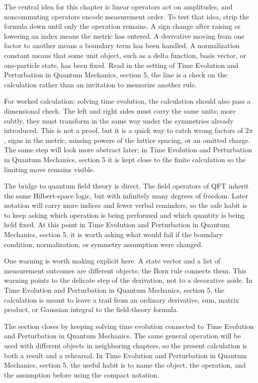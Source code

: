 The central idea for this chapter is linear operators act on amplitudes, and noncommuting operators encode measurement order.  To test that idea, strip the formula down until only the operation remains.  A sign change after raising or lowering an index means the metric has entered.  A derivative moving from one factor to another means a boundary term has been handled.  A normalization constant means that some unit object, such as a delta function, basis vector, or one-particle state, has been fixed.  Read in the setting of Time Evolution and Perturbation in Quantum Mechanics, section 5, the line is a check on the calculation rather than an invitation to memorize another rule.

For worked calculation: solving time evolution, the calculation should also pass a dimensional check.  The left and right sides must carry the same units; more subtly, they must transform in the same way under the symmetries already introduced.  This is not a proof, but it is a quick way to catch wrong factors of \(2\pi\), signs in the metric, missing powers of the lattice spacing, or an omitted charge.  The same step will look more abstract later; in Time Evolution and Perturbation in Quantum Mechanics, section 5 it is kept close to the finite calculation so the limiting move remains visible.

The bridge to quantum field theory is direct.  The field operators of QFT inherit the same Hilbert-space logic, but with infinitely many degrees of freedom.  Later notation will carry more indices and fewer verbal reminders, so the safe habit is to keep asking which operation is being performed and which quantity is being held fixed.  At this point in Time Evolution and Perturbation in Quantum Mechanics, section 5, it is worth asking what would fail if the boundary condition, normalization, or symmetry assumption were changed.

One warning is worth making explicit here.  A state vector and a list of measurement outcomes are different objects; the Born rule connects them.  This warning points to the delicate step of the derivation, not to a decorative aside.  In Time Evolution and Perturbation in Quantum Mechanics, section 5, the calculation is meant to leave a trail from an ordinary derivative, sum, matrix product, or Gaussian integral to the field-theory formula.

The section closes by keeping solving time evolution connected to Time Evolution and Perturbation in Quantum Mechanics.  The same general operation will be used with different objects in neighboring chapters, so the present calculation is both a result and a rehearsal.  In Time Evolution and Perturbation in Quantum Mechanics, section 5, the useful habit is to name the object, the operation, and the assumption before using the compact notation.



